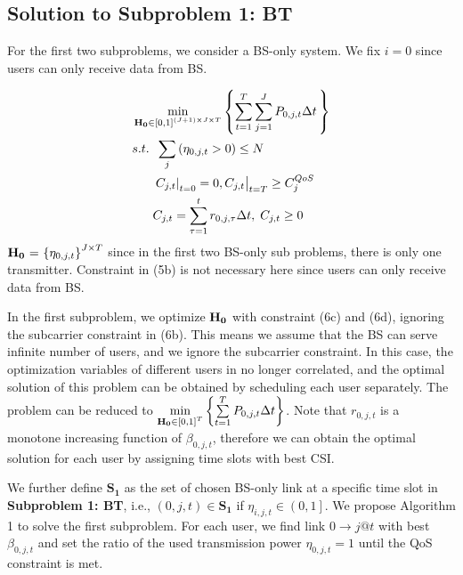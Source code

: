 \documentclass{ieeeaccess}
\begin{document}
\subsection{Solution to \textbf{Subproblem 1: BT}}

For the first two subproblems, we consider a BS-only system. We fix $i = 0$ since users can only receive data from BS.

\begin{subequations}
\begin{align}
& \mathop {\min }\limits_{{\mathbf{{\rm H}}}_{\mathbf{0}} \in {{\left[ {0,1} \right]}^{\left( {J + 1} \right) \times J \times T}}} \left\{ {\sum\limits_{t = 1}^T {\sum\limits_{j = 1}^J {{P_{0,j,t}}\Delta t} \,} } \right\} \\
& {s.t.} \;\; \sum\limits_j  {\left( {{\eta _{0,j,t}} > 0} \right)}   \le N \\
& \;\;\;\;\;\; {\left. {{{\left. {{C_{j,t}}} \right|}_{t = 0}} = 0, {C_{j,t}}} \right|_{t = T}} \ge C_j^{QoS} \\
& \;\;\;\;\;\; {C_{j,t}} = \sum\limits_{\tau  = 1}^t {{r_{0,j,\tau }}\Delta t} ,\; {C_{j,t}} \ge 0
\end{align}
\end{subequations}
${{\mathbf{{\rm H}}}_{\mathbf{0}}}{\text{ = }}{\left\{ {{\eta _{0,j,t}}} \right\}^{J \times T}}$ since in the first two BS-only sub problems, there is only one transmitter. 
Constraint in (5b) is not necessary here since users can only receive data from BS.

In the first subproblem, we optimize ${{\mathbf{{\rm H}}}_{\mathbf{0}}}$ with constraint (6c) and (6d), ignoring the subcarrier constraint in (6b). This means we assume that the BS can serve infinite number of users, and we ignore the subcarrier constraint. In this case, the optimization variables of different users in no longer correlated, and the optimal solution of this problem can be obtained by scheduling each user separately. The problem can be reduced to $\mathop {\min }\limits_{{{\mathbf{{\rm H}}}_{\mathbf{0}}} \in {{\left[ {0,1} \right]}^T}} \left\{ {\sum\limits_{t = 1}^T {{P_{0,j,t}}\Delta t} } \right\}$. Note that ${r_{0,j,t}}$ is a monotone increasing function of ${\beta _{0,j,t}}$, therefore we can obtain the optimal solution for each user by assigning time slots with best CSI. 

We further define ${{\mathbf{S}}_{\mathbf{1}}}$ as the set of chosen BS-only link at a specific time slot in \textbf{Subproblem 1: BT}, i.e., $\left( {0,j,t} \right) \in {\mathbf{S}}_{\mathbf{1}}$ if ${\eta _{i,j,t}} \in \left( {0,1} \right]$. We propose Algorithm 1 to solve the first subproblem.
For each user, we find link $0 \to j@t$ with best ${\beta _{0,j,t}}$ and set the ratio of the used transmission power ${\eta _{0,j,t} = 1}$ until the QoS constraint is met.
\end{document}
